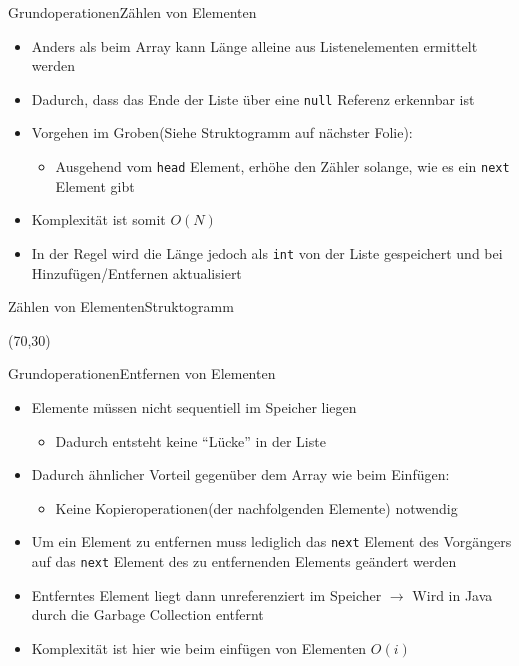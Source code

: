 \begin{frame}{Grundoperationen}{Zählen von Elementen}
	\begin{itemize}
		\item Anders als beim Array kann Länge alleine aus Listenelementen ermittelt werden
		\item Dadurch, dass das Ende der Liste über eine \texttt{null} Referenz erkennbar ist
		\item Vorgehen im Groben(Siehe Struktogramm auf nächster Folie):
		\begin{itemize}
			\item Ausgehend vom \texttt{head} Element, erhöhe den Zähler solange, wie es ein \texttt{next} Element gibt
		\end{itemize}
		\item Komplexität ist somit $O(N)$
		\item In der Regel wird die Länge jedoch als \texttt{int} von der Liste gespeichert und bei Hinzufügen/Entfernen aktualisiert
	\end{itemize}
\end{frame}

\begin{frame}{Zählen von Elementen}{Struktogramm}
\begin{centernss}
	\begin{struktogramm}(70,30)
		\whileend
	\end{struktogramm}
\end{centernss}
\end{frame}

\begin{frame}{Grundoperationen}{Entfernen von Elementen}
	\begin{itemize}
		\item Elemente müssen nicht sequentiell im Speicher liegen
		\begin{itemize}
			\item Dadurch entsteht keine "`Lücke"' in der Liste
		\end{itemize}
		\item Dadurch ähnlicher Vorteil gegenüber dem Array wie beim Einfügen:
		\begin{itemize}
			\item Keine Kopieroperationen(der nachfolgenden Elemente) notwendig
		\end{itemize}
		\item Um ein Element zu entfernen muss lediglich das \texttt{next} Element des Vorgängers auf das \texttt{next} Element des
		zu entfernenden Elements geändert werden
		\item Entferntes Element liegt dann unreferenziert im Speicher $\rightarrow$ Wird in Java durch die Garbage Collection entfernt
		\item Komplexität ist hier wie beim einfügen von Elementen $O(i)$
	\end{itemize}
\end{frame}

